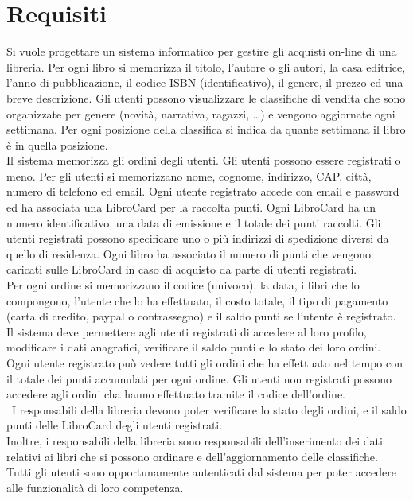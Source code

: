 \documentclass[a4paper,12pt,titlepage]{article}
\begin{document}
\begin{frontespizio}
\end{frontespizio}




\tableofcontents
\thispagestyle{empty}

\cleardoublepage

\setcounter{page}{1}

\section{Requisiti}\label{sec:requisiti}
Si vuole progettare un sistema informatico per gestire gli acquisti on-line di una libreria.
Per ogni libro si memorizza il titolo, l’autore o gli autori, la casa editrice, l’anno di pubblicazione, il
codice ISBN (identificativo), il genere, il prezzo ed una breve descrizione. Gli utenti possono
visualizzare le classifiche di vendita che sono organizzate per genere (novità, narrativa, ragazzi, …)
e vengono aggiornate ogni settimana. Per ogni posizione della classifica si indica da quante
settimana il libro è in quella posizione.\\
Il sistema memorizza gli ordini degli utenti. Gli utenti possono essere registrati o meno. Per gli
utenti si memorizzano nome, cognome, indirizzo, CAP, città, numero di telefono ed email. Ogni
utente registrato accede con email e password ed ha associata una LibroCard per la raccolta punti.
Ogni LibroCard ha un numero identificativo, una data di emissione e il totale dei punti raccolti. Gli
utenti registrati possono specificare uno o più indirizzi di spedizione diversi da quello di residenza.
Ogni libro ha associato il numero di punti che vengono caricati sulle LibroCard in caso di acquisto
da parte di utenti registrati.\\
Per ogni ordine si memorizzano il codice (univoco), la data, i libri che lo compongono, l’utente che
lo ha effettuato, il costo totale, il tipo di pagamento (carta di credito, paypal o contrassegno) e il
saldo punti se l’utente è registrato.\\
Il sistema deve permettere agli utenti registrati di accedere al loro profilo, modificare i dati
anagrafici, verificare il saldo punti e lo stato dei loro ordini. Ogni utente registrato può vedere tutti
gli ordini che ha effettuato nel tempo con il totale dei punti accumulati per ogni ordine.
Gli utenti non registrati possono accedere agli ordini cha hanno effettuato tramite il codice
dell’ordine.\\\
I responsabili della libreria devono poter verificare lo stato degli ordini, e il saldo punti delle
LibroCard degli utenti registrati.\\
Inoltre, i responsabili della libreria sono responsabili dell’inserimento dei dati relativi ai libri che si
possono ordinare e dell’aggiornamento delle classifiche.\\
Tutti gli utenti sono opportunamente autenticati dal sistema per poter accedere alle funzionalità
di loro competenza.
\end{document}
